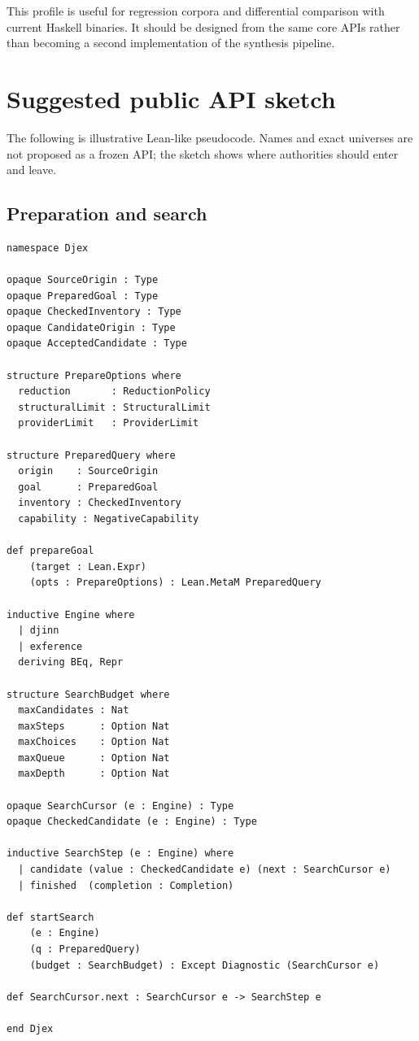 \documentclass[10pt,letterpaper,oneside]{report}
\begin{document}
This profile is useful for regression corpora and differential comparison with current Haskell binaries. It should be designed from the same core APIs rather than becoming a second implementation of the synthesis pipeline.

\chapter{Suggested public API sketch}\label{app:api-sketch}

The following is illustrative Lean-like pseudocode. Names and exact universes are not proposed as a frozen API; the sketch shows where authorities should enter and leave.

\section{Preparation and search}

\begin{lstlisting}[language=Leanish]
namespace Djex

opaque SourceOrigin : Type
opaque PreparedGoal : Type
opaque CheckedInventory : Type
opaque CandidateOrigin : Type
opaque AcceptedCandidate : Type

structure PrepareOptions where
  reduction       : ReductionPolicy
  structuralLimit : StructuralLimit
  providerLimit   : ProviderLimit

structure PreparedQuery where
  origin    : SourceOrigin
  goal      : PreparedGoal
  inventory : CheckedInventory
  capability : NegativeCapability

def prepareGoal
    (target : Lean.Expr)
    (opts : PrepareOptions) : Lean.MetaM PreparedQuery

inductive Engine where
  | djinn
  | exference
  deriving BEq, Repr

structure SearchBudget where
  maxCandidates : Nat
  maxSteps      : Option Nat
  maxChoices    : Option Nat
  maxQueue      : Option Nat
  maxDepth      : Option Nat

opaque SearchCursor (e : Engine) : Type
opaque CheckedCandidate (e : Engine) : Type

inductive SearchStep (e : Engine) where
  | candidate (value : CheckedCandidate e) (next : SearchCursor e)
  | finished  (completion : Completion)

def startSearch
    (e : Engine)
    (q : PreparedQuery)
    (budget : SearchBudget) : Except Diagnostic (SearchCursor e)

def SearchCursor.next : SearchCursor e -> SearchStep e

end Djex
\end{lstlisting}
\end{document}
